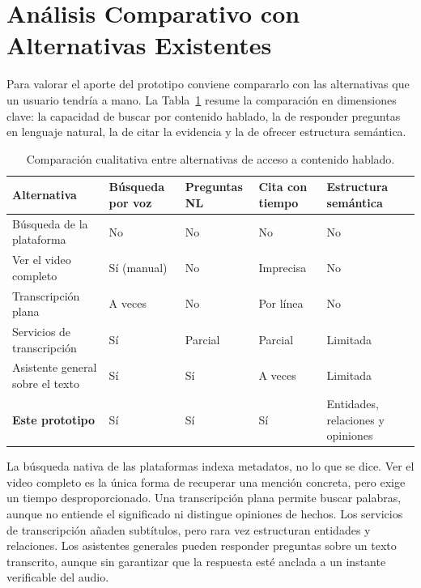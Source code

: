 \documentclass[12pt,a4paper]{article}
\begin{document}

\section{Análisis Comparativo con Alternativas Existentes}
\label{sec:comparacion}

Para valorar el aporte del prototipo conviene compararlo con las alternativas que un usuario tendría a mano. La Tabla~\ref{tab:comparacion} resume la comparación en dimensiones clave: la capacidad de buscar por contenido hablado, la de responder preguntas en lenguaje natural, la de citar la evidencia y la de ofrecer estructura semántica.

\begin{table}[h]
\centering
\small
\begin{tabular}{@{}p{3.5cm}p{2.4cm}p{2.4cm}p{2.4cm}p{3.2cm}@{}}
\toprule
\textbf{Alternativa} & \textbf{Búsqueda por voz} & \textbf{Preguntas NL} & \textbf{Cita con tiempo} & \textbf{Estructura semántica} \\
\midrule
Búsqueda de la plataforma & No & No & No & No \\
Ver el video completo & Sí (manual) & No & Imprecisa & No \\
Transcripción plana & A veces & No & Por línea & No \\
Servicios de transcripción & Sí & Parcial & Parcial & Limitada \\
Asistente general sobre el texto & Sí & Sí & A veces & Limitada \\
\textbf{Este prototipo} & Sí & Sí & Sí & Entidades, relaciones y opiniones \\
\bottomrule
\end{tabular}
\caption{Comparación cualitativa entre alternativas de acceso a contenido hablado.}
\label{tab:comparacion}
\end{table}

La búsqueda nativa de las plataformas indexa metadatos, no lo que se dice. Ver el video completo es la única forma de recuperar una mención concreta, pero exige un tiempo desproporcionado. Una transcripción plana permite buscar palabras, aunque no entiende el significado ni distingue opiniones de hechos. Los servicios de transcripción añaden subtítulos, pero rara vez estructuran entidades y relaciones. Los asistentes generales pueden responder preguntas sobre un texto transcrito, aunque sin garantizar que la respuesta esté anclada a un instante verificable del audio.
\end{document}
